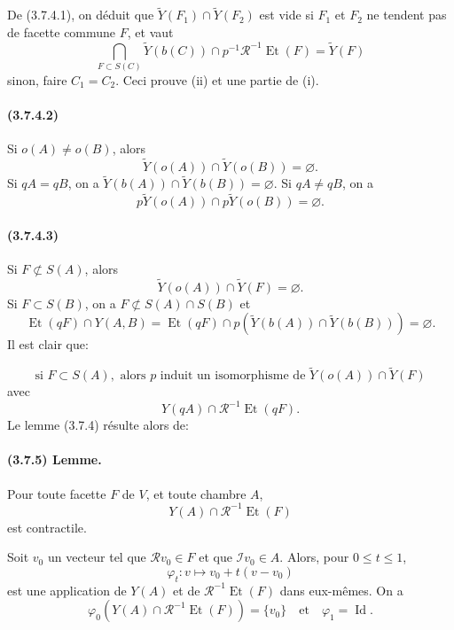 \documentclass[10pt]{article}
\begin{document}
De (3.7.4.1), on déduit que \(\widetilde Y(F_1)\cap\widetilde Y(F_2)\) est vide si \(F_1\) et \(F_2\) ne tendent pas de facette commune \(F\), et vaut
\[
\bigcap_{F\subset S(C)}
\widetilde Y(b(C))\cap p^{-1}\mathcal R^{-1}\operatorname{Et}(F)
=\widetilde Y(F)
\]
sinon, faire \(C_1=C_2\). Ceci prouve (ii) et une partie de (i).

\paragraph{(3.7.4.2)} Si \(o(A)\ne o(B)\), alors
\[
\widetilde Y(o(A))\cap\widetilde Y(o(B))=\varnothing.
\]
Si \(qA=qB\), on a \(\widetilde Y(b(A))\cap \widetilde Y(b(B))=\varnothing\). Si \(qA\ne qB\), on a
\[
p\widetilde Y(o(A))\cap p\widetilde Y(o(B))=\varnothing.
\]

\paragraph{(3.7.4.3)} Si \(F\not\subset S(A)\), alors
\[
\widetilde Y(o(A))\cap\widetilde Y(F)=\varnothing.
\]
Si \(F\subset S(B)\), on a \(F\not\subset S(A)\cap S(B)\) et
\[
\operatorname{Et}(qF)\cap Y(A,B)
=\operatorname{Et}(qF)\cap p(\widetilde Y(b(A))\cap\widetilde Y(b(B)))=\varnothing.
\]
Il est clair que:

\[
\tag{3.7.4.4}
\text{si }F\subset S(A),\text{ alors }p\text{ induit un isomorphisme de }
\widetilde Y(o(A))\cap\widetilde Y(F)
\]
avec
\[
Y(qA)\cap\mathcal R^{-1}\operatorname{Et}(qF).
\]
Le lemme (3.7.4) résulte alors de:

\paragraph{(3.7.5) Lemme.} Pour toute facette \(F\) de \(V\), et toute chambre \(A\),
\[
Y(A)\cap\mathcal R^{-1}\operatorname{Et}(F)
\]
est contractile.

Soit \(v_0\) un vecteur tel que \(\mathcal Rv_0\in F\) et que \(\mathcal Iv_0\in A\). Alors, pour \(0\le t\le1\),
\[
\varphi_t:v\longmapsto v_0+t(v-v_0)
\]
est une application de \(Y(A)\) et de \(\mathcal R^{-1}\operatorname{Et}(F)\) dans eux-mêmes. On a
\[
\varphi_0(Y(A)\cap\mathcal R^{-1}\operatorname{Et}(F))=\{v_0\}
\quad\text{et}\quad
\varphi_1=\operatorname{Id}.
\]
\end{document}
